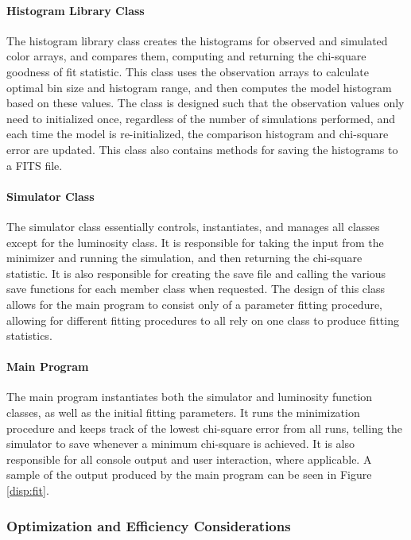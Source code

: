 \documentclass[twocolumn,letterpaper,10pt]{article}
\begin{document}
\paragraph{Histogram Library Class}
The histogram library class creates the histograms for observed and simulated color arrays, and compares them, computing and returning the chi-square goodness of fit statistic. This class uses the observation arrays to calculate optimal bin size and histogram range, and then computes the model histogram based on these values. The class is designed such that the observation values only need to initialized once, regardless of the number of simulations performed, and each time the model is re-initialized, the comparison histogram and chi-square error are updated. This class also contains methods for saving the histograms to a FITS file.

\paragraph{Simulator Class}
The simulator class essentially controls, instantiates, and manages all classes except for the luminosity class. It is responsible for taking the input from the minimizer and running the simulation, and then returning the chi-square statistic. It is also responsible for creating the save file and calling the various save functions for each member class when requested. The design of this class allows for the main program to consist only of a parameter fitting procedure, allowing for different fitting procedures to all rely on one class to produce fitting statistics.

\paragraph{Main Program}

The main program instantiates both the simulator and luminosity function classes, as well as the initial fitting parameters. It runs the minimization procedure and keeps track of the lowest chi-square error from all runs, telling the simulator to save whenever a minimum chi-square is achieved. It is also responsible for all console output and user interaction, where applicable. A sample of the output produced by the main program can be seen in Figure \ref{disp:fit}.

\subsubsection{Optimization and Efficiency Considerations}
\end{document}
